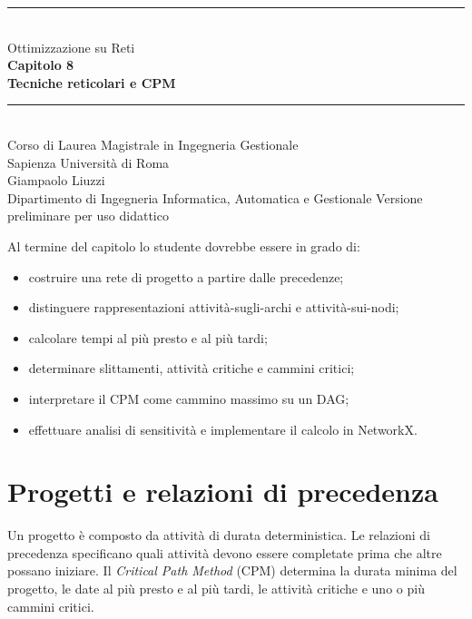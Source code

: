 \documentclass[11pt,a4paper]{article}
\begin{document}
\hypersetup{pageanchor=false}
\begin{titlepage}\centering\vspace*{1.6cm}
{\color{sapienzared}\rule{\textwidth}{1.2pt}}\\[1.1cm]{\Large Ottimizzazione su Reti}\\[0.35cm]
{\huge\bfseries Capitolo 8}\\[0.45cm]{\LARGE\bfseries Tecniche reticolari e CPM}\\[1.1cm]
{\color{sapienzared}\rule{0.72\textwidth}{0.8pt}}\\[1.1cm]
{\large Corso di Laurea Magistrale in Ingegneria Gestionale}\\[0.25cm]{\large Sapienza Università di Roma}\\[1.2cm]
{\large Giampaolo Liuzzi}\\[0.25cm]{\normalsize Dipartimento di Ingegneria Informatica, Automatica e Gestionale}
\vfill{\small Versione preliminare per uso didattico}\end{titlepage}
\hypersetup{pageanchor=true}\tableofcontents\newpage{}

\begin{learningbox}
Al termine del capitolo lo studente dovrebbe essere in grado di:
\begin{itemize}[nosep]
\item costruire una rete di progetto a partire dalle precedenze;
\item distinguere rappresentazioni attività-sugli-archi e attività-sui-nodi;
\item calcolare tempi al più presto e al più tardi;
\item determinare slittamenti, attività critiche e cammini critici;
\item interpretare il CPM come cammino massimo su un DAG;
\item effettuare analisi di sensitività e implementare il calcolo in NetworkX.
\end{itemize}
\end{learningbox}

\section{Progetti e relazioni di precedenza}
Un progetto è composto da attività di durata deterministica. Le relazioni di precedenza specificano quali attività devono essere completate prima che altre possano iniziare. Il \emph{Critical Path Method} (CPM) determina la durata minima del progetto, le date al più presto e al più tardi, le attività critiche e uno o più cammini critici.
\end{document}
